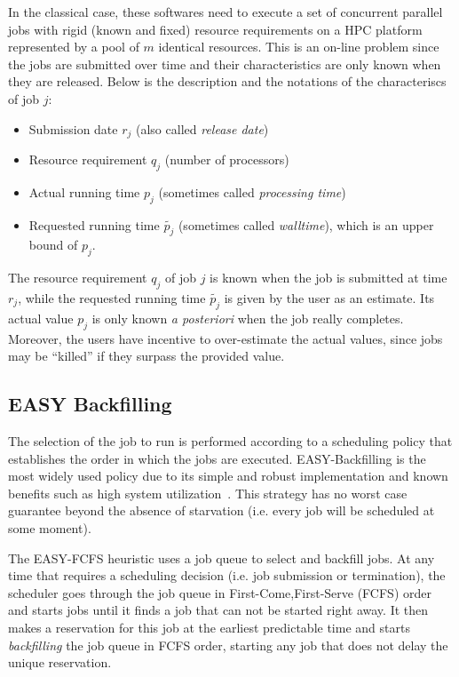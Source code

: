 \documentclass[sigconf]{acmart}
\begin{document}
In the classical case, these softwares need to execute a set of concurrent
parallel jobs with rigid (known and fixed) resource requirements on a HPC
platform represented by a pool of $m$ identical resources. This is an on-line
problem since the jobs are submitted over time and their characteristics are only known when they are released.
Below is the description and the notations of the characteriscs of job $j$:

\begin{itemize}
  \item Submission date $r_j$ (also called \textit{release date})

  \item Resource requirement $q_j$ (number of processors)

  \item Actual running time $p_j$ (sometimes called \textit{processing time})

  \item Requested running time $\widetilde{p_j}$ (sometimes called \textit{walltime}), which is an upper bound of $p_j$.

\end{itemize}

The resource requirement $q_j$ of job $j$ is known when the job is submitted at
time $r_j$, while the requested running time $\widetilde{p_j}$ is given by the
user as an estimate. Its actual value $p_j$ is only known \textit{a posteriori}
when the job really completes.  Moreover, the users have incentive to
over-estimate the actual values, since jobs may be ``killed'' if they
surpass the provided value.
\subsection{EASY Backfilling}
\label{sub:easy}

The selection of the job to run is performed according to a
scheduling policy that establishes the order in which the jobs are executed.
EASY-Backfilling is the most widely used policy due to its simple and robust
implementation and known benefits such as high system
utilization~\cite{easy}. This strategy has no worst case guarantee beyond
the absence of starvation (i.e. every job will be scheduled at some moment).

The EASY-FCFS heuristic uses a job queue to select and backfill jobs.  At any
time that requires a scheduling decision (i.e. job submission or termination),
the scheduler goes through the job queue in First-Come,First-Serve (FCFS) order
and starts jobs until it finds a job that can not be started right away. It
then makes a reservation for this job at the earliest predictable time and
starts \textit{backfilling} the job queue in FCFS order, starting any job that
does not delay the unique reservation.
\end{document}
